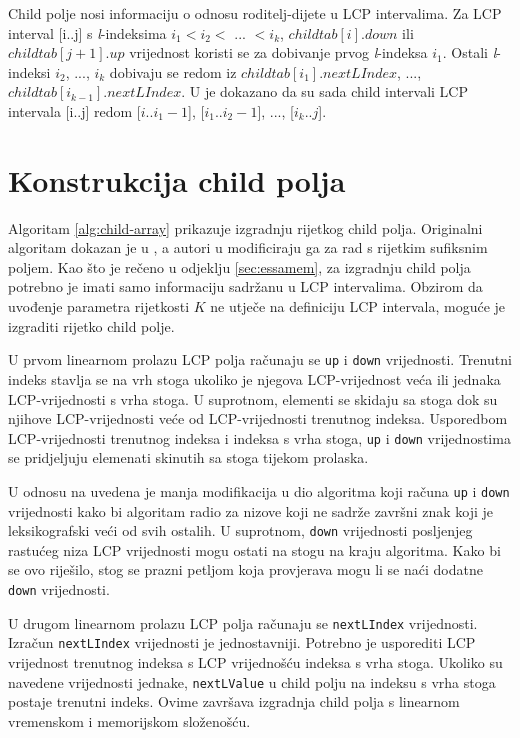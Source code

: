 \documentclass[times, utf8, seminar, numeric]{fer}
\begin{document}
Child polje nosi informaciju o odnosu roditelj-dijete u LCP intervalima. Za LCP interval [i..j] s \textit{l}-indeksima $i_1 < i _2 <$ ... $< i_k$, $childtab[i].down$ ili $childtab[j+1].up$ vrijednost koristi se za dobivanje prvog \textit{l}-indeksa $i_1$. Ostali \textit{l}-indeksi $i _2$, ..., $i_k$ dobivaju se redom iz $childtab[i_1].nextLIndex$, ..., $childtab[i_{k-1}].nextLIndex$. U \cite{esa} je dokazano da su sada child intervali LCP intervala [i..j] redom [$i..i_1-1$], [$i_1..i_2-1$], ..., [$i_k..j$].

\section{Konstrukcija child polja}
\label{sec:construction}

Algoritam \ref{alg:child-array} prikazuje izgradnju rijetkog child polja. Originalni algoritam dokazan je u \cite{esa}, a autori u \cite{essa} modificiraju ga za rad s rijetkim sufiksnim poljem. Kao što je rečeno u odjeklju \ref{sec:essamem}, za izgradnju child polja potrebno je imati samo informaciju sadržanu u LCP intervalima. Obzirom da uvođenje parametra rijetkosti $K$ ne utječe na definiciju LCP intervala, moguće je izgraditi rijetko child polje.

U prvom linearnom prolazu LCP polja računaju se \texttt{up} i \texttt{down} vrijednosti. Trenutni indeks stavlja se na vrh stoga ukoliko je njegova LCP-vrijednost veća ili jednaka LCP-vrijednosti s vrha stoga. U suprotnom, elementi se skidaju sa stoga dok su njihove LCP-vrijednosti veće od LCP-vrijednosti trenutnog indeksa. Usporedbom LCP-vrijednosti trenutnog indeksa i indeksa s vrha stoga, \texttt{up} i \texttt{down} vrijednostima se pridjeljuju elemenati skinutih sa stoga tijekom prolaska.

U odnosu na \cite{esa} uvedena je manja modifikacija u dio algoritma koji računa \texttt{up} i \texttt{down} vrijednosti kako bi algoritam radio za nizove koji ne sadrže završni znak koji je leksikografski veći od svih ostalih. U suprotnom, \texttt{down} vrijednosti posljenjeg rastućeg niza LCP vrijednosti mogu ostati na stogu na kraju algoritma. Kako bi se ovo riješilo, stog se prazni petljom koja provjerava mogu li se naći dodatne \texttt{down} vrijednosti.

U drugom linearnom prolazu LCP polja računaju se \texttt{nextLIndex} vrijednosti. Izračun \texttt{nextLIndex} vrijednosti je jednostavniji. Potrebno je usporediti LCP vrijednost trenutnog indeksa s LCP vrijednošću indeksa s vrha stoga. Ukoliko su navedene vrijednosti jednake, \texttt{nextLValue} u child polju na indeksu s vrha stoga  postaje trenutni indeks. Ovime završava izgradnja child polja s linearnom vremenskom i memorijskom složenošću.
\end{document}
